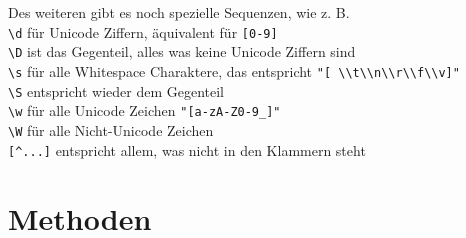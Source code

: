 \documentclass[ignorenonframetext,]{beamer}
\begin{document}
\begin{frame}

Des weiteren gibt es noch spezielle Sequenzen, wie z. B.\\
\texttt{\textbackslash{}d} für Unicode Ziffern, äquivalent für
\texttt{{[}0-9{]}}\\
\texttt{\textbackslash{}D} ist das Gegenteil, alles was keine Unicode
Ziffern sind\\
\texttt{\textbackslash{}s} für alle Whitespace Charaktere, das
entspricht
\texttt{"{[}\ \textbackslash{}\textbackslash{}t\textbackslash{}\textbackslash{}n\textbackslash{}\textbackslash{}r\textbackslash{}\textbackslash{}f\textbackslash{}\textbackslash{}v{]}"}\\
\texttt{\textbackslash{}S} entspricht wieder dem Gegenteil\\
\texttt{\textbackslash{}w} für alle Unicode Zeichen
\texttt{"{[}a-zA-Z0-9\_{]}"}\\
\texttt{\textbackslash{}W} für alle Nicht-Unicode Zeichen\\
\texttt{{[}\^{}...{]}} entspricht allem, was nicht in den Klammern steht

\end{frame}

\section{Methoden}\label{methoden}
\end{document}
